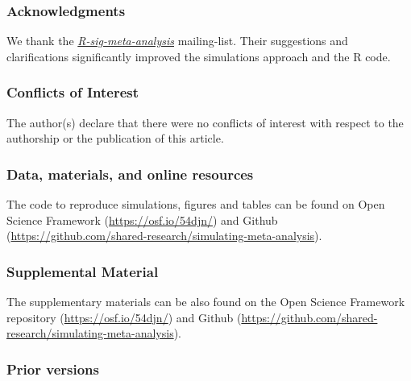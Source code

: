 \documentclass[
  man,floatsintext]{apa6}
\begin{document}
\newpage

\subsubsection*{Acknowledgments}\label{acknowledgments}

We thank the \emph{\href{https://stat.ethz.ch/mailman/listinfo/r-sig-meta-analysis}{R-sig-meta-analysis}} mailing-list. Their suggestions and clarifications significantly improved the simulations approach and the R code.

\subsubsection*{Conflicts of Interest}\label{conflicts-of-interest}

The author(s) declare that there were no conflicts of interest with respect to the authorship or the publication of this article.

\subsubsection*{Data, materials, and online resources}\label{data-materials-and-online-resources}

The code to reproduce simulations, figures and tables can be found on Open Science Framework (\url{https://osf.io/54djn/}) and Github (\url{https://github.com/shared-research/simulating-meta-analysis}).

\subsubsection*{Supplemental Material}\label{supplemental-material}

The supplementary materials can be also found on the Open Science Framework repository (\url{https://osf.io/54djn/}) and Github (\url{https://github.com/shared-research/simulating-meta-analysis}).

\subsubsection*{Prior versions}\label{prior-versions}
\end{document}
